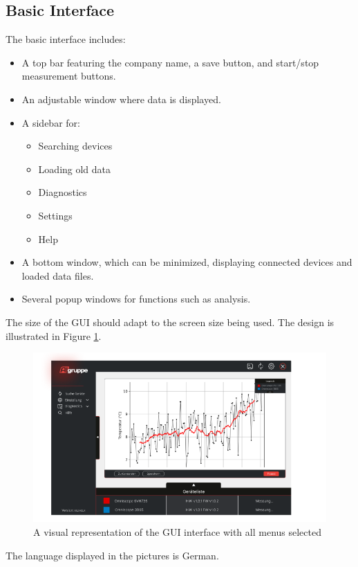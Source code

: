 \documentclass[]{scrreprt}
\begin{document}
\subsection{Basic Interface}


The basic interface includes:
\begin{itemize}
\item A top bar featuring the company name, a save button, and start/stop measurement buttons.
\item An adjustable window where data is displayed.
\item A sidebar for:
    \begin{itemize}
    \item Searching devices
    \item Loading old data
    \item Diagnostics
    \item Settings
    \item Help
    \end{itemize}
\item A bottom window, which can be minimized, displaying connected devices and loaded data files.
\item Several popup windows for functions such as analysis.
\end{itemize}


The size of the GUI should adapt to the screen size being used. The design is illustrated in Figure \ref{fig:GUI}.


\begin{figure}[!h]
\includegraphics[width=.9\textwidth]{./assets/pictures/DatawindowVersion1.0.png}
\caption[]{A visual representation of the GUI interface with all menus selected}
\label{fig:GUI}
\end{figure}


The language displayed in the pictures is German.
\end{document}
